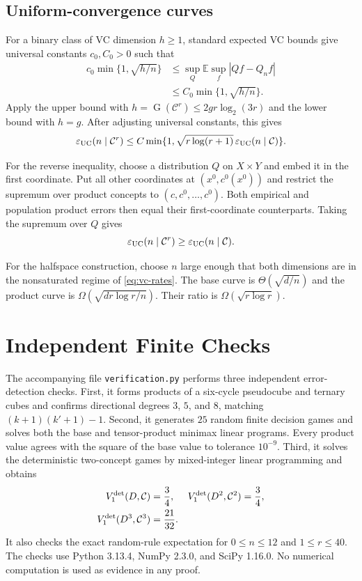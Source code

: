 \documentclass[twoside]{article}
\newcommand{\E}{\mathbb E}
\newcommand{\G}{\operatorname{G}}
\newcommand{\cC}{\mathcal C}
\begin{document}
\subsection{Uniform-convergence curves}

For a binary class of VC dimension $h\geq1$, standard expected VC bounds give universal constants $c_0,C_0>0$ such that
\begin{equation}
\begin{aligned}
c_0\min\{1,\sqrt{h/n}\}&\leq\sup_Q\E\sup_f|Qf-Q_nf|\\
&\leq C_0\min\{1,\sqrt{h/n}\}.
\end{aligned}
\label{eq:vc-rates}
\end{equation}
Apply the upper bound with $h=\G(\cC^r)\leq2gr\log_2(3r)$ and the lower bound with $h=g$. After adjusting universal constants, this gives
\[
\varepsilon_{\rm UC}(n\mid\cC^r)\leq C\min\{1,\sqrt{r\log(r+1)}\,\varepsilon_{\rm UC}(n\mid\cC)\}.
\]

For the reverse inequality, choose a distribution $Q$ on $X\times Y$ and embed it in the first coordinate. Put all other coordinates at $(x^0,c^0(x^0))$ and restrict the supremum over product concepts to $(c,c^0,\ldots,c^0)$. Both empirical and population product errors then equal their first-coordinate counterparts. Taking the supremum over $Q$ gives
\[
\varepsilon_{\rm UC}(n\mid\cC^r)\geq\varepsilon_{\rm UC}(n\mid\cC).
\]

For the halfspace construction, choose $n$ large enough that both dimensions are in the nonsaturated regime of \eqref{eq:vc-rates}. The base curve is $\Theta(\sqrt{d/n})$ and the product curve is $\Omega(\sqrt{dr\log r/n})$. Their ratio is $\Omega(\sqrt{r\log r})$.

\section{Independent Finite Checks}
\label{app:checks}

The accompanying file \texttt{verification.py} performs three independent error-detection checks. First, it forms products of a six-cycle pseudocube and ternary cubes and confirms directional degrees $3$, $5$, and $8$, matching $(k+1)(k'+1)-1$. Second, it generates $25$ random finite decision games and solves both the base and tensor-product minimax linear programs. Every product value agrees with the square of the base value to tolerance $10^{-9}$. Third, it solves the deterministic two-concept games by mixed-integer linear programming and obtains
\[
\begin{aligned}
V_1^{\rm det}(D,\cC)&=\frac34,&
V_1^{\rm det}(D^2,\cC^2)&=\frac34,\\
V_1^{\rm det}(D^3,\cC^3)&=\frac{21}{32}.&&
\end{aligned}
\]
It also checks the exact random-rule expectation for $0\leq n\leq12$ and $1\leq r\leq40$. The checks use Python 3.13.4, NumPy 2.3.0, and SciPy 1.16.0. No numerical computation is used as evidence in any proof.


\end{document}
